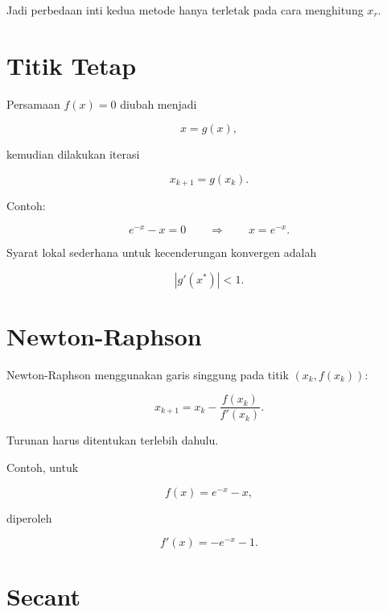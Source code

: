 Jadi perbedaan inti kedua metode hanya terletak pada cara menghitung $x_r$.

\section{Titik Tetap}

Persamaan $f(x)=0$ diubah menjadi

\begin{equation}
x=g(x),
\end{equation}

kemudian dilakukan iterasi

\begin{equation}
x_{k+1}=g(x_k).
\end{equation}

Contoh:

\begin{equation}
e^{-x}-x=0
\qquad\Longrightarrow\qquad
x=e^{-x}.
\end{equation}

Syarat lokal sederhana untuk kecenderungan konvergen adalah

\begin{equation}
|g'(x^\ast)|<1.
\end{equation}

\section{Newton-Raphson}

Newton-Raphson menggunakan garis singgung pada titik $(x_k,f(x_k))$:

\begin{equation}
x_{k+1}
=
x_k-\frac{f(x_k)}{f'(x_k)}.
\end{equation}

Turunan harus ditentukan terlebih dahulu.

Contoh, untuk

\begin{equation}
f(x)=e^{-x}-x,
\end{equation}

diperoleh

\begin{equation}
f'(x)=-e^{-x}-1.
\end{equation}

\section{Secant}

